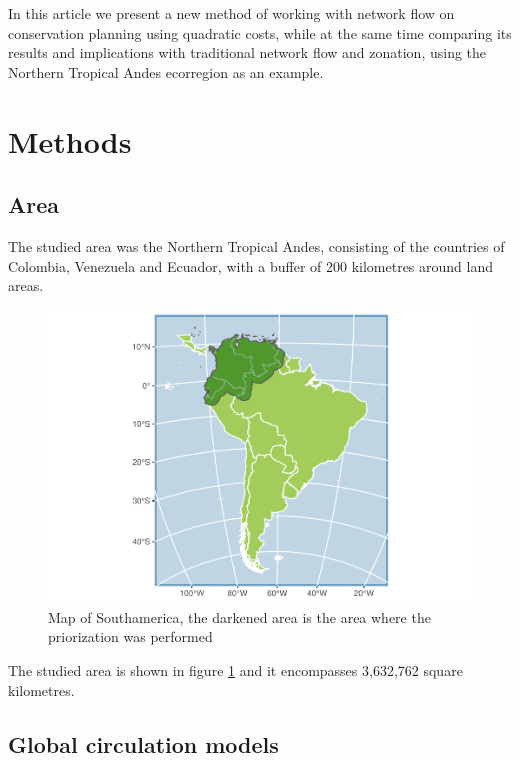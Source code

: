 \documentclass[]{article}
\begin{document}
In this article we present a new method of working with network flow on conservation planning using quadratic costs, while at the same time comparing its results and implications with traditional network flow and zonation, using the Northern Tropical Andes ecorregion as an example.

\hypertarget{methods}{%
\section{Methods}\label{methods}}

\hypertarget{area}{%
\subsection{Area}\label{area}}

The studied area was the Northern Tropical Andes, consisting of the countries of Colombia, Venezuela and Ecuador, with a buffer of 200 kilometres around land areas.

\begin{figure}

{\centering \includegraphics{NFPaper_files/figure-latex/MapArea-1} 

}

\caption{Map of Southamerica, the darkened area is the area where the priorization was performed}\label{fig:MapArea}
\end{figure}

The studied area is shown in figure \ref{fig:MapArea} and it encompasses 3,632,762 square kilometres.

\hypertarget{global-circulation-models}{%
\subsection{Global circulation models}\label{global-circulation-models}}
\end{document}
